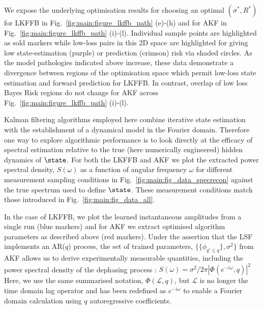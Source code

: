 We expose the underlying optimisation results for choosing an optimal $(\sigma^*, R^*)$ for LKFFB in Fig.~\ref{fig:main:figure_lkffb_path} (e)-(h) and for AKF in Fig.~\ref{fig:main:figure_lkffb_path} (i)-(l). Individual sample points are highlighted as sold markers while low-loss pairs in this 2D space are highlighted for giving low state-estimation (purple) or prediction (crimson) risk via shaded circles.  As the model pathologies indicated above increase, these data demonstrate a divergence between regions of the optimisation space which permit low-loss state estimation and forward prediction for LKFFB.  In contrast, overlap of low loss Bayes Risk regions do not change for AKF across Fig.~\ref{fig:main:figure_lkffb_path} (i)-(l).



Kalman filtering algorithms employed here combine iterative state estimation with the establishment of a dynamical model in the Fourier domain.  Therefore one way to explore algorithmic performance is to look directly at the efficacy of spectral estimation relative to the true (here numerically engineered) hidden dynamics of $\state$.  For both the LKFFB and AKF we plot the extracted power spectral density, $S(\omega)$ as a function of angular frequency $\omega$ for different measurement sampling conditions in Fig.~\ref{fig:main:fig_data_specrecon} against the true spectrum used to define $\state$.  These measurement conditions match those introduced in Fig.~\ref{fig:main:fig_data_all}.

In the case of LKFFB, we plot the learned instantaneous amplitudes from a single run (blue markers) and for AKF we extract optimised algorithm parameters as described above (red markers). Under the assertion that the LSF implements an AR($q$) process, the set of trained parameters, $\{  \{\phi_{q' \leq q}\}, \sigma^2\}$ from AKF allows us to derive experimentally measurable quantities, including the power spectral density of the dephasing process \cite{brockwell1996introduction}:
$S(\omega) = \sigma^2/ 2 \pi |\Phi(e^{-i\omega}, q)|^2$ %
Here, we use the same summarised notation, $\Phi(\mathcal{L}, q)$, but  $\mathcal{L}$ is no longer the time domain lag operator and has been redefined as $e^{-i\omega}$ to enable a Fourier domain calculation using $q$ autoregressive coefficients. 

